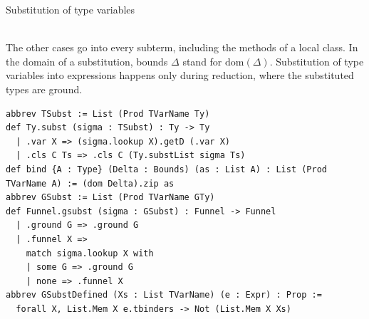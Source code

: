 \begin{cmp}{Substitution of type variables}
\begin{paperside}
\\[1ex]
The other cases go into every subterm, including the methods of a local class.
In the domain of a substitution, bounds $\Delta$ stand for $\mathrm{dom}(\Delta)$.
Substitution of type variables into expressions happens only during reduction, where the substituted types are ground.
\end{paperside}
\begin{leanside}
\begin{lstlisting}[style=leanside]
abbrev TSubst := List (Prod TVarName Ty)
def Ty.subst (sigma : TSubst) : Ty -> Ty
  | .var X => (sigma.lookup X).getD (.var X)
  | .cls C Ts => .cls C (Ty.substList sigma Ts)
def bind {A : Type} (Delta : Bounds) (as : List A) : List (Prod TVarName A) := (dom Delta).zip as
abbrev GSubst := List (Prod TVarName GTy)
def Funnel.gsubst (sigma : GSubst) : Funnel -> Funnel
  | .ground G => .ground G
  | .funnel X =>
    match sigma.lookup X with
    | some G => .ground G
    | none => .funnel X
abbrev GSubstDefined (Xs : List TVarName) (e : Expr) : Prop :=
  forall X, List.Mem X e.tbinders -> Not (List.Mem X Xs)
\end{lstlisting}
\end{leanside}
\end{cmp}


